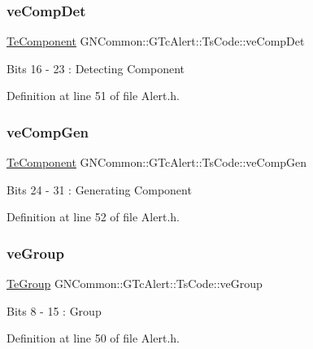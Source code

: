 \subsubsection{\texorpdfstring{ve\+Comp\+Det}{veCompDet}}
{\footnotesize\ttfamily \mbox{\hyperlink{class_g_n_common_1_1_g_tc_alert_aec0a7908321c01ae225df4908d7f3fa0}{Te\+Component}} G\+N\+Common\+::\+G\+Tc\+Alert\+::\+Ts\+Code\+::ve\+Comp\+Det}

Bits 16 -\/ 23 \+: Detecting Component 

Definition at line 51 of file Alert.\+h.

\mbox{\label{struct_g_n_common_1_1_g_tc_alert_1_1_ts_code_aab8ef411910f365c4149b13da11228cb}} 
\subsubsection{\texorpdfstring{ve\+Comp\+Gen}{veCompGen}}
{\footnotesize\ttfamily \mbox{\hyperlink{class_g_n_common_1_1_g_tc_alert_aec0a7908321c01ae225df4908d7f3fa0}{Te\+Component}} G\+N\+Common\+::\+G\+Tc\+Alert\+::\+Ts\+Code\+::ve\+Comp\+Gen}

Bits 24 -\/ 31 \+: Generating Component 

Definition at line 52 of file Alert.\+h.

\mbox{\label{struct_g_n_common_1_1_g_tc_alert_1_1_ts_code_a5d0eff781b125af6518d4d11304bf1a5}} 
\subsubsection{\texorpdfstring{ve\+Group}{veGroup}}
{\footnotesize\ttfamily \mbox{\hyperlink{class_g_n_common_1_1_g_tc_alert_a2deb7f82fcf5d88b4e10d74fa6c28cb7}{Te\+Group}} G\+N\+Common\+::\+G\+Tc\+Alert\+::\+Ts\+Code\+::ve\+Group}

Bits 8 -\/ 15 \+: Group 

Definition at line 50 of file Alert.\+h.

